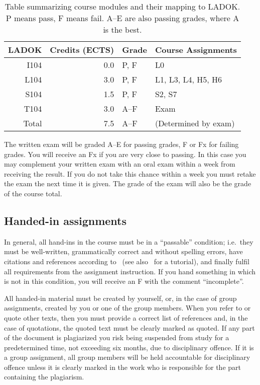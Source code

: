 \begin{table}
  \centering
  \caption{%
    Table summarizing course modules and their mapping to LADOK\@.
    P means pass, F means fail.
    A--E are also passing grades, where A is the best.
  }\label{LADOKTable}
  \begin{tabular}{rrll}
    \toprule
    LADOK & Credits (ECTS)  & Grade       & Course Assignments\\
    \midrule
    I104  & 0.0             & P, F        & L0\\
    L104  & 3.0             & P, F        & L1, L3, L4, H5, H6\\
    S104  & 1.5             & P, F        & S2, S7\\
    T104  & 3.0             & A--F        & Exam\\
    \midrule
    Total & 7.5             & A--F        & (Determined by exam)\\
    \bottomrule
  \end{tabular}
\end{table}

The written exam will be graded A--E for passing grades, F or Fx for failing 
grades.
You will receive an Fx if you are very close to passing.
In this case you may complement your written exam with an oral exam within 
a week from receiving the result.
If you do not take this chance within a week you must retake the exam the next 
time it is given.
The grade of the exam will also be the grade of the course total.

\subsection{Handed-in assignments}

In general, all hand-ins in the course must be in a \enquote{passable} 
condition; i.e.\ they must be well-written, grammatically correct and without 
spelling errors, have citations and references according to~\cite{IEEEcitation} 
(see also~\cite{PurdueCitation} for a tutorial), and finally fulfil all 
requirements from the assignment instruction.
If you hand something in which is not in this condition, you will receive an 
F with the comment \enquote{incomplete}.

All handed-in material must be created by yourself, or, in the case of group 
assignments, created by you or one of the group members.
When you refer to or quote other texts, then you must provide a correct list of 
references and, in the case of quotations, the quoted text must be clearly 
marked as quoted.
If any part of the document is plagiarized you risk being suspended from study  
for a predetermined time, not exceeding six months, due to disciplinary 
offence.
If it is a group assignment, all group members will be held accountable for 
disciplinary offence unless it is clearly marked in the work who is responsible 
for the part containing the plagiarism.

